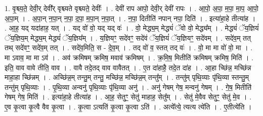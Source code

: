 \documentclass[17pt]{extarticle}
\begin{document}
1. वृ॒श्च्य॒ते॒ देवी॒र् देवी᳚र् वृश्च्यते वृश्च्यते॒ देवीः᳚ । . देवी॑ राप आपो॒ देवी॒र् देवी॑ रापः । . आ॒पो॒ अ॒पा॒ म॒पा॒ मा॒प॒ आ॒पो॒ अ॒पा॒म् । . अ॒पा॒न् न॒पा॒न् न॒पा॒ द॒पा॒ म॒पा॒न् न॒पा॒त् । . न॒पा॒ दितीति॑ नपान् नपा॒ दिति॑ । . इत्या॑हा॒हे तीत्या॑ह । . आ॒ह॒ यद् यदा॑हाह॒ यत् । . यद् वो॑ वो॒ यद् यद् वः॑ । . वो॒ मेद्ध्य॒म् मेद्ध्यं॑ ॅवो वो॒ मेद्ध्य᳚म् । . मेद्ध्यं॑ ॅय॒ज्ञियं॑ ॅय॒ज्ञिय॒म् मेद्ध्य॒म् मेद्ध्यं॑ ॅय॒ज्ञिय᳚म् । . य॒ज्ञियꣳ॒॒ सदे॑वꣳ॒॒ सदे॑वं ॅय॒ज्ञियं॑ ॅय॒ज्ञियꣳ॒॒ सदे॑वम् । . सदे॑व॒म् तत् तथ् सदे॑वꣳ॒॒ सदे॑व॒म् तत् । . सदे॑व॒मिति॒ स - दे॒व॒म् । . तद् वो॑ व॒ स्तत् तद् वः॑ । . वो॒ मा मा वो॑ वो॒ मा । . मा ऽवाव॒ मा मा ऽव॑ । . अव॑ क्रमिषम् क्रमिष॒ मवाव॑ क्रमिषम् । . क्र॒मि॒ष॒ मितीति॑ क्रमिषम् क्रमिष॒ मिति॑ । . इति॒ वाव वावे तीति॒ वाव । . वावै तदे॒तद् वाव वावैतत् । . ए॒त दा॑हाहै॒ तदे॒त दा॑ह । . आ॒हा च्छि॑न्न॒ मच्छि॑न्न माहा॒हा च्छि॑न्नम् । . अच्छि॑न्न॒म् तन्तु॒म् तन्तु॒ मच्छि॑न्न॒ मच्छि॑न्न॒म् तन्तु᳚म् । . तन्तु॑म् पृथि॒व्याः पृ॑थि॒व्या स्तन्तु॒म् तन्तु॑म् पृथि॒व्याः । . पृ॒थि॒व्या अन्वनु॑ पृथि॒व्याः पृ॑थि॒व्या अनु॑ । . अनु॑ गेषम् गेष॒ मन्वनु॑ गेषम् । . गे॒ष॒ मितीति॑ गेषम् गेष॒ मिति॑ । . इत्या॑हा॒हे तीत्या॑ह । . आ॒ह॒ सेतुꣳ॒॒ सेतु॑ माहाह॒ सेतु᳚म् । . सेतु॑ मे॒वैव सेतुꣳ॒॒ सेतु॑ मे॒व । . ए॒व कृ॒त्वा कृ॒त्वै वैव कृ॒त्वा । . कृ॒त्वा ऽत्यति॑ कृ॒त्वा कृ॒त्वा ऽति॑ । . अत्ये᳚त्ये॒ त्यत्य त्ये॑ति । . ए॒तीत्ये॑ति । \newline
\end{document}
